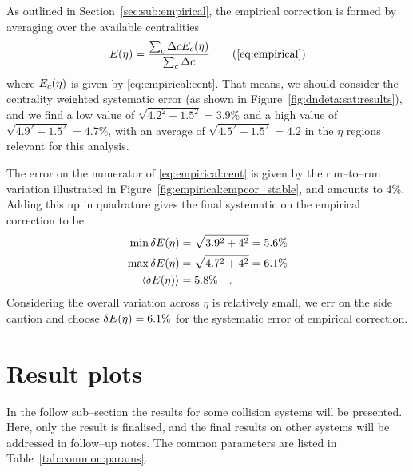 \documentclass[compat,11pt]{alicenote}
\newcommand*\EmpCor[1][]{\ensuremath E\ifx|#1|\relax\else_{#1}\fi(\eta)}
\newcommand{\secref}[1]{Section~\ref{#1}}
\newcommand{\tabref}[1]{Table~\ref{#1}}
\newcommand{\figref}[1]{Figure~\ref{#1}}
\begin{document}
As outlined in \secref{sec:sub:empirical}, the empirical correction is
formed by averaging over the available centralities 
\begin{equation}
  \EmpCor{} = \frac{\sum_c \Delta c\EmpCor[c]{}}{\sum_c \Delta c}
  \tag{\ref{eq:empirical}}
\end{equation}
where $\EmpCor[c]{}$ is given by \eqref{eq:empirical:cent}.  That
means, we should consider the centrality weighted systematic error (as
shown in \figref{fig:dndeta:sat:results}), and we find a low value of
$\sqrt{4.2^2-1.5^2}=3.9\%$ and a high value of
$\sqrt{4.9^2-1.5^2}=4.7\%$, with an average of
$\sqrt{4.5^2-1.5^2}=4.2$ in the $\eta$ regions relevant for this
analysis. 

The error on the numerator of \eqref{eq:empirical:cent} is given by
the run--to--run variation illustrated in
\figref{fig:empirical:empcor_stable}, and amounts to 4\%.  Adding this
up in quadrature gives the final systematic on the empirical
correction to be 
\begin{align}
  \label{eq:empcorr:syserr}
  \min{\delta\EmpCor{}} &= \sqrt{3.9^2+4^2} = 5.6\%\nonumber\\
  \max{\delta\EmpCor{}} &= \sqrt{4.7^2+4^2} = 6.1\%\nonumber\\
  \langle\delta\EmpCor{}\rangle &= 5.8\%\quad.\\
\end{align}
Considering the overall variation across $\eta$ is relatively small,
we err on the side caution and choose $\delta\EmpCor{}=6.1\%$ for the
systematic error of empirical correction. 


\section{Result plots} 

In the follow sub--section the \ndndeta{} results for some collision
systems will be presented.  Here, only the \PbPbCol{} result is
finalised, and the final results on other systems will be addressed in
follow--up notes.   The common parameters are listed in
\tabref{tab:common:params}. 
\end{document}
